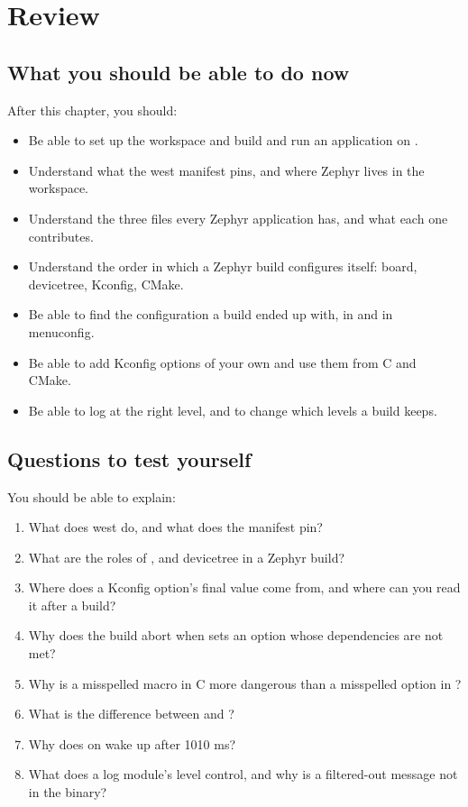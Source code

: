 
\section{Review}
\label{c1:sec:review}

\subsection*{What you should be able to do now}
After this chapter, you should:

\begin{itemize}
  \item Be able to set up the workspace and build and run an application on .
  \item Understand what the west manifest pins, and where Zephyr lives in the workspace.
  \item Understand the three files every Zephyr application has, and what each one contributes.
  \item Understand the order in which a Zephyr build configures itself: board, devicetree, Kconfig, CMake.
  \item Be able to find the configuration a build ended up with, in  and in menuconfig.
  \item Be able to add Kconfig options of your own and use them from C and CMake.
  \item Be able to log at the right level, and to change which levels a build keeps.
\end{itemize}

\subsection*{Questions to test yourself}
You should be able to explain:

\begin{enumerate}
  \item What does west do, and what does the manifest  pin?
  \item What are the roles of ,  and devicetree in a Zephyr build?
  \item Where does a Kconfig option’s final value come from, and where can you read it after a build?
  \item Why does the build abort when  sets an option whose dependencies are not met?
  \item Why is a misspelled  macro in C more dangerous than a misspelled option in
    ?
  \item What is the difference between  and ?
  \item Why does  on  wake up after 1010 ms?
  \item What does a log module’s level control, and why is a filtered-out message not in the binary?
\end{enumerate}

